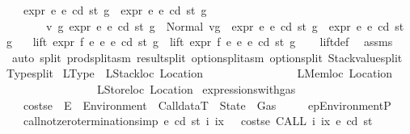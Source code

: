 \begin{isabellebody}
\ \ \ {\isachardoublequoteopen}expr\ e{}\ e\ cd\ st\ g\ {\isacharequal}{\kern0pt}\ expr{\isacharprime}{\kern0pt}\ e{}\ e\ cd\ st\ g{\isachardoublequoteclose}\isanewline
\ \ \ \ \ \ \ {\isachardoublequoteopen}{\isasymAnd}v\ g{\isacharprime}{\kern0pt}{\isachardot}{\kern0pt}\ expr{\isacharprime}{\kern0pt}\ e{}\ e\ cd\ st\ g\ {\isacharequal}{\kern0pt}\ Normal\ {\isacharparenleft}{\kern0pt}v{\isacharcomma}{\kern0pt}g{\isacharprime}{\kern0pt}{\isacharparenright}{\kern0pt}\ {\isasymLongrightarrow}\ expr\ e{}\ e\ cd\ st\ g{\isacharprime}{\kern0pt}\ {\isacharequal}{\kern0pt}\ expr{\isacharprime}{\kern0pt}\ e{}\ e\ cd\ st\ g{\isacharprime}{\kern0pt}{\isachardoublequoteclose}\isanewline
\ \ \ {\isachardoublequoteopen}lift\ expr\ f\ e{}\ e{}\ e\ cd\ st\ g\ {\isacharequal}{\kern0pt}\ lift\ expr{\isacharprime}{\kern0pt}\ f\ e{}\ e{}\ e\ cd\ st\ g{\isachardoublequoteclose}\isanewline
%
\isadelimproof
\ \ %
\endisadelimproof
%
\isatagproof
{}\isamarkupfalse%
\ lift{\isacharunderscore}{\kern0pt}def\ \isamarkupfalse%
\ assms\ \isamarkupfalse%
\ {\isacharparenleft}{\kern0pt}auto\ split{\isacharcolon}{\kern0pt}\ prod{\isachardot}{\kern0pt}split{\isacharunderscore}{\kern0pt}asm\ result{\isachardot}{\kern0pt}split\ option{\isachardot}{\kern0pt}split{\isacharunderscore}{\kern0pt}asm\ option{\isachardot}{\kern0pt}split\ Stackvalue{\isachardot}{\kern0pt}split\ Type{\isachardot}{\kern0pt}split{\isacharparenright}{\kern0pt}%
\endisatagproof
{\isafoldproof}%
%
\isadelimproof
\isanewline
%
\endisadelimproof
\isanewline
{}\isamarkupfalse%
\ LType\ {\isacharequal}{\kern0pt}\ LStackloc\ Location\isanewline
\ \ \ \ \ \ \ \ \ \ \ \ \ \ \ {\isacharbar}{\kern0pt}\ LMemloc\ Location\isanewline
\ \ \ \ \ \ \ \ \ \ \ \ \ \ \ {\isacharbar}{\kern0pt}\ LStoreloc\ Location\isanewline
\isanewline
\isanewline
{}\isamarkupfalse%
\ expressions{\isacharunderscore}{\kern0pt}with{\isacharunderscore}{\kern0pt}gas\ {\isacharequal}{\kern0pt}\isanewline
\ \ \ costs\isactrlsub e\ {\isacharcolon}{\kern0pt}{\isacharcolon}{\kern0pt}\ {\isachardoublequoteopen}E\ {\isasymRightarrow}\ Environment\ {\isasymRightarrow}\ CalldataT\ {\isasymRightarrow}\ State\ {\isasymRightarrow}\ Gas{\isachardoublequoteclose}\isanewline
\ \ \ \ \ ep{\isacharcolon}{\kern0pt}{\isacharcolon}{\kern0pt}Environment\isactrlsub P\isanewline
\ \ \ call{\isacharunderscore}{\kern0pt}not{\isacharunderscore}{\kern0pt}zero{\isacharbrackleft}{\kern0pt}termination{\isacharunderscore}{\kern0pt}simp{\isacharbrackright}{\kern0pt}{\isacharcolon}{\kern0pt}\ {\isachardoublequoteopen}{\isasymAnd}e\ cd\ st\ i\ ix{\isachardot}{\kern0pt}\ {}\ {\isacharless}{\kern0pt}\ {\isacharparenleft}{\kern0pt}costs\isactrlsub e\ {\isacharparenleft}{\kern0pt}CALL\ i\ ix{\isacharparenright}{\kern0pt}\ e\ cd\ st{\isacharparenright}{\kern0pt}{\isachardoublequoteclose}\isanewline

\end{isabellebody}
